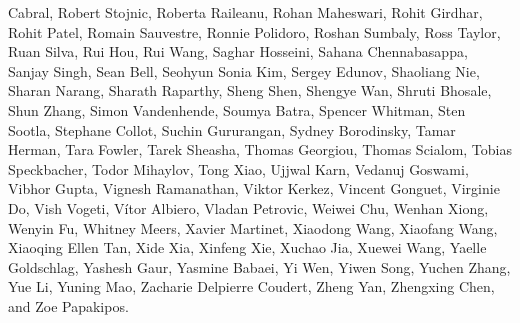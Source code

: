 Cabral, Robert Stojnic, Roberta Raileanu, Rohan Maheswari, Rohit Girdhar, Rohit Patel, Romain Sauvestre, Ronnie Polidoro, Roshan Sumbaly, Ross Taylor, Ruan Silva, Rui Hou, Rui Wang, Saghar Hosseini, Sahana Chennabasappa, Sanjay Singh, Sean Bell, Seohyun Sonia Kim, Sergey Edunov, Shaoliang Nie, Sharan Narang, Sharath Raparthy, Sheng Shen, Shengye Wan, Shruti Bhosale, Shun Zhang, Simon Vandenhende, Soumya Batra, Spencer Whitman, Sten Sootla, Stephane Collot, Suchin Gururangan, Sydney Borodinsky, Tamar Herman, Tara Fowler, Tarek Sheasha, Thomas Georgiou, Thomas Scialom, Tobias Speckbacher, Todor Mihaylov, Tong Xiao, Ujjwal Karn, Vedanuj Goswami, Vibhor Gupta, Vignesh Ramanathan, Viktor Kerkez, Vincent Gonguet, Virginie Do, Vish Vogeti, Vítor Albiero, Vladan Petrovic, Weiwei Chu, Wenhan Xiong, Wenyin Fu, Whitney Meers, Xavier Martinet, Xiaodong Wang, Xiaofang Wang, Xiaoqing Ellen Tan, Xide Xia, Xinfeng Xie, Xuchao Jia, Xuewei Wang, Yaelle Goldschlag, Yashesh Gaur, Yasmine Babaei, Yi Wen, Yiwen Song, Yuchen Zhang, Yue Li, Yuning Mao, Zacharie Delpierre Coudert, Zheng Yan, Zhengxing Chen, and Zoe Papakipos.

